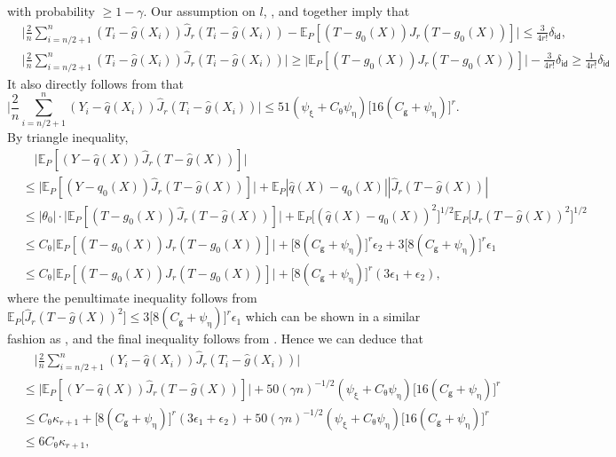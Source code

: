 \documentclass{article}
\def\eps{{\epsilon}}
\newcommand{\E}{\mathbb{E}}
\begin{document}
with probability $\geq 1-\gamma$. 
Our assumption on $l$, , and  together imply that
\begin{equation}
    \label{eq:T-term-positive}
    \begin{aligned}
        & \bigg|\frac{2}{n} \sum_{i=n/2+1}^{n} (T_i-\hat{g}(X_i))\hat{J}_r(T_i-\hat{g}(X_i))-\E_{P}\left[ (T-g_0(X))J_r(T-g_0(X)) \right]\bigg| \leq \frac{3}{4r!}\delta_{\mathsf{id}}, \\
        & \bigg|\frac{2}{n} \sum_{i=n/2+1}^{n} (T_i-\hat{g}(X_i))\hat{J}_r(T_i-\hat{g}(X_i))\bigg| \geq \Big|\E_{P}\left[ (T-g_0(X))J_r(T-g_0(X)) \right]\Big|-\frac{3}{4r!}\delta_{\mathsf{id}} \geq\frac{1}{4r!}\delta_{\mathsf{id}}
    \end{aligned}
\end{equation}
It also directly follows from  that
\[
\bigg|\frac{2}{n} \sum_{i=n/2+1}^{n} (Y_i-\hat{q}(X_i))\hat{J}_r(T_i-\hat{g}(X_i))\bigg| \leq 51(\psi_{\upxi}+C_{\uptheta}\psi_{\upeta})\big[16(C_{\mathsf{g}}+\psi_{\upeta})\big]^{r}.
\]
By triangle inequality,
\begin{align}
    &\quad  \Big|\E_{P}\left[ (Y-\hat{q}(X))\hat{J}_r(T-\hat{g}(X)) \right]\Big| \nonumber \\
    &\leq \Big|\E_{P}\left[ (Y-q_0(X))\hat{J}_r(T-\hat{g}(X)) \right]\Big| + \E_{P}|\hat{q}(X)-q_0(X)||\hat{J}_r(T-\hat{g}(X))| \nonumber \\
    &\leq |\theta_0|\cdot \Big|\E_{P}\left[ (T-g_0(X))\hat{J}_r(T-\hat{g}(X)) \right]\Big| + \E_P\big[(\hat{q}(X)-q_0(X))^2\big]^{1/2} \E_P\big[\hat{J}_r(T-\hat{g}(X))^2 \big]^{1/2} \nonumber \\
    &\leq C_{\uptheta} \Big|\E_{P}\left[ (T-g_0(X))J_r(T-g_0(X)) \right]\Big| + \big[8(C_{\mathsf{g}}+\psi_{\upeta})\big]^r\eps_2 + 3\big[8(C_{\mathsf{g}}+\psi_{\upeta})\big]^r\eps_1 \nonumber \\
    &\leq C_{\uptheta} \Big|\E_{P}\left[ (T-g_0(X))J_r(T-g_0(X)) \right]\Big| + \big[8(C_{\mathsf{g}}+\psi_{\upeta})\big]^r (3\eps_1+\eps_2), \nonumber
\end{align}
where the penultimate inequality follows from $\E_P\big[\hat{J}_r(T-\hat{g}(X))^2 \big] \leq 3\big[8(C_{\mathsf{g}}+\psi_{\upeta})\big]^r\eps_1$ which can be shown in a similar fashion as , and the final inequality follows from . Hence we can deduce that
\begin{align}
    &\quad \bigg|\frac{2}{n} \sum_{i=n/2+1}^{n} (Y_i-\hat{q}(X_i))\hat{J}_r(T_i-\hat{g}(X_i))\bigg| \nonumber \\
    &\leq \Big|\E_{P}\left[ (Y-\hat{q}(X))\hat{J}_r(T-\hat{g}(X)) \right]\Big| + 50(\gamma n)^{-1/2}(\psi_{\upxi}+C_{\uptheta}\psi_{\upeta})\big[16(C_{\mathsf{g}}+\psi_{\upeta})\big]^{r} \nonumber \\
    &\leq C_{\uptheta}\kappa_{r+1} + \big[8(C_{\mathsf{g}}+\psi_{\upeta})\big]^r (3\eps_1+\eps_2) + 50(\gamma n)^{-1/2}(\psi_{\upxi}+C_{\uptheta}\psi_{\upeta})\big[16(C_{\mathsf{g}}+\psi_{\upeta})\big]^{r} \label{eq:empirical-y-1} \\
    &\leq 6C_{\uptheta}\kappa_{r+1}, \label{eq:empirical-y-2}
\end{align}
\end{document}
